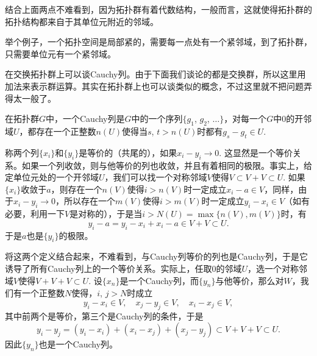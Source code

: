 结合上面两点不难看到，因为拓扑群有着代数结构，一般而言，这就使得拓扑群的拓扑结构都来自于其单位元附近的邻域。

举个例子，一个拓扑空间是局部紧的，需要每一点处有一个紧邻域，到了拓扑群，只需要单位元有一个紧邻域。



\begin{para}[Cauchy列]
在交换拓扑群上可以谈Cauchy列。由于下面我们谈论的都是交换群，所以这里用加法来表示群运算。其实在拓扑群上也可以谈类似的概念，不过这里就不把问题弄得太一般了。

在拓扑群$G$中，一个Cauchy列是$G$中的一个序列$\{g_1$, $g_2$, $\dots\}$，对每一个$G$中$0$的开邻域$U$，都存在一个正整数$n(U)$使得当$s$, $t>n(U)$时都有$g_s-g_t\in U$. 

称两个列$\{x_i\}$和$\{y_i\}$是等价的（共尾的），如果$x_i-y_i\to 0$. 这显然是一个等价关系。如果一个列收敛，则与他等价的列也收敛，并且有着相同的极限。事实上，给定单位元处的一个开邻域$U$，我们可以找一个对称邻域$V$使得$V\subset V+V\subset U$. 如果$\{x_i\}$收敛于$a$，则存在一个$n(V)$使得$i>n(V)$时一定成立$x_i-a\in V$，同样，由于$x_i-y_i\to 0$，所以存在一个$m(V)$使得$i>m(V)$时一定成立$y_i-x_i\in V$（如有必要，利用一下$V$是对称的），于是当$i>N(U)=\max\{n(V),m(V)\}$时，有
\[
	y_i-a=y_i-x_i+x_i-a\in V+V\subset U.
\]
于是$a$也是$\{y_i\}$的极限。

将这两个定义结合起来，不难看到，与Cauchy列等价的列也是Cauchy列，于是它诱导了所有Cauchy列上的一个等价关系。实际上，任取$0$的邻域$U$，选一个对称邻域$V$使得$V+V+V\subset U$. 设$\{x_n\}$是一个Cauchy列，而$\{y_n\}$与他等价，那么对$W$，我们有一个正整数$N$使得，$i$, $j>N$时成立
\[
	y_i-x_i\in V,\quad x_j-y_j\in V,\quad x_i-x_j\in V,
\]
其中前两个是等价，第三个是Cauchy列的条件，于是
\[
	y_i-y_j=(y_i-x_i)+(x_i-x_j)+(x_j-y_j)\subset V+V+V\subset U.
\]
因此$\{y_n\}$也是一个Cauchy列。

\end{para}

